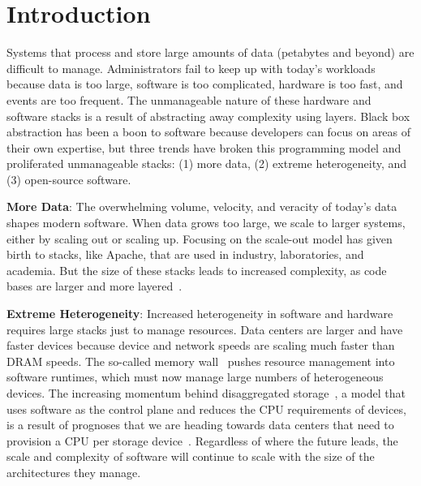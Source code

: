 \chapter{Introduction}

Systems that process and store large amounts of data (petabytes and beyond) are
difficult to manage. Administrators fail to keep up with today's workloads
because data is too large, software is too complicated, hardware is too fast,
and events are too frequent. The unmanageable nature of these hardware and
software stacks is a result of abstracting away complexity using layers. Black
box abstraction has been a boon to software because developers can focus on
areas of their own expertise, but three trends have broken this programming
model and proliferated unmanageable stacks: (1) more data, (2) extreme
heterogeneity, and (3) open-source software. 

\textbf{More Data}: The overwhelming volume, velocity, and veracity of today's
data shapes modern software. When data grows too large, we scale to larger
systems, either by scaling out or scaling up. Focusing on the scale-out model
has given birth to stacks, like Apache, that are used in industry,
laboratories, and academia. But the size of these stacks leads to increased
complexity, as code bases are larger and more
layered~\cite{sevilla:eurosys17-malacology}.

\textbf{Extreme Heterogeneity}: Increased heterogeneity in software and
hardware requires large stacks just to manage resources.  Data centers are
larger and have faster devices because device and network speeds are scaling
much faster than DRAM speeds. The so-called memory
wall~\cite{wulf:sigarch1995-memory-wall} pushes resource management into
software runtimes, which must now manage large numbers of heterogeneous
devices. The increasing momentum behind disaggregated
storage~\cite{klimovic:asplos2017-reflex, klimovic:eurosys16-disagg}, a model
that uses software as the control plane and reduces the CPU requirements of
devices, is a result of prognoses that we are heading towards data centers that
need to provision a CPU per storage device~\cite{samuels:oss16}. Regardless of
where the future leads, the scale and complexity of software will continue to
scale with the size of the architectures they manage.

